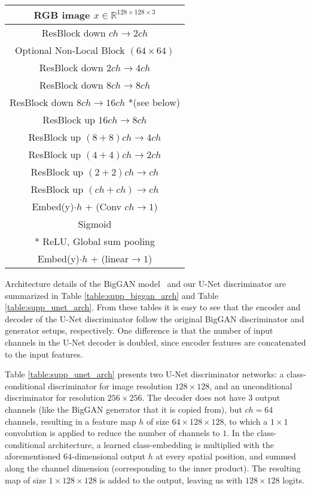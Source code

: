 \documentclass[10pt,twocolumn,letterpaper]{article}
\begin{document}
\begin{table*}
\begin{minipage}[t]{.45\textwidth}
\begin{tabular}{c}
	\hline 	\hline
    RGB image $x \in \mathbb{R}^{128 \times 128 \times 3}$ \\
	\hline
	ResBlock down $ch \rightarrow  2ch$ \\
	\hline
	Optional Non-Local Block $(64 \times 64)$ \\
	\hline
	ResBlock down $2ch \rightarrow  4ch$ \\
	\hline
	ResBlock down $8ch \rightarrow  8ch$ \\
	\hline
	ResBlock down $8ch \rightarrow  16ch$ *(see below) \\
	\hline
	\hline
	ResBlock up $16ch \rightarrow  8ch$ \\
	\hline
	ResBlock up $(8+8)ch \rightarrow  4ch$ \\
	\hline
	ResBlock up $(4+4)ch \rightarrow  2ch$ \\
	\hline
	ResBlock up $(2+2)ch \rightarrow  ch$ \\
	\hline
	ResBlock up $(ch + ch) \rightarrow  ch$ \\
	\hline
	Embed(y)$\cdot h$ + (Conv $ch\rightarrow 1$)	 \\
	\hline
	Sigmoid \\
	\hline 	\hline
	* ReLU, Global sum pooling \\
	\hline
	Embed(y)$\cdot h$ + (linear$\rightarrow 1$)	 	 \\
 \hline 	\hline 
     \end{tabular}

	\end{minipage}	
\caption{The U-Net GAN discriminator architectures for class-conditional (a) and unconditional (b) tasks of generating images at resolution $128\times128$ and $256\times 256$, respectively.} \label{table:supp_unet_arch} \end{table*}
 
Architecture details of the BigGAN model~\cite{Brock2019} and our U-Net discriminator are summarized in Table \ref{table:supp_biggan_arch} and Table \ref{table:supp_unet_arch}. From these tables it is easy to see that the encoder and decoder of the U-Net discriminator follow the original BigGAN discriminator and generator setups, respectively. One difference is that the number of input channels in the U-Net decoder is doubled, since encoder features are concatenated to the input features. 

Table \ref{table:supp_unet_arch} presents two U-Net discriminator networks: a class-conditional discriminator for image resolution $128\times 128$, and an unconditional discriminator for resolution $256\times 256$. The decoder does not have $3$ output channels (like the BigGAN generator that it is copied from), but $ch=64$ channels, resulting in a feature map $h$ of size $64\times 128 \times 128$, to which a $1\times 1$ convolution is applied to reduce the number of channels to $1$. In the class-conditional architecture, a learned class-embedding is multiplied with the aforementioned $64$-dimensional output $h$ at every spatial position, and summed along the channel dimension (corresponding to the inner product). The resulting map of size $1\times 128 \times 128$ is added to the output, leaving us with $128 \times 128$ logits. 
\end{document}
